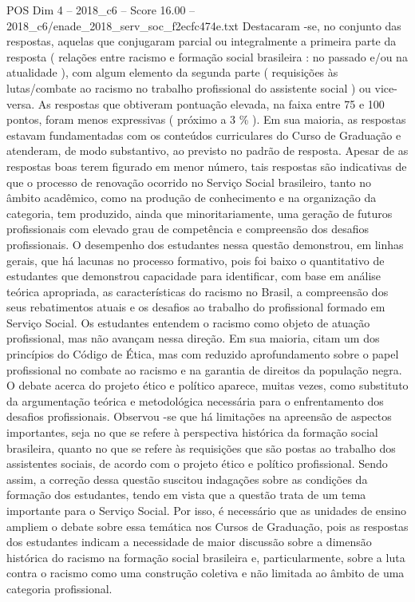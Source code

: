 \begin{textsample}{POS Dim 4 – 2018\_c6 – Score 16.00 – 2018\_c6/enade\_2018\_serv\_soc\_f2ecfc474e.txt}
Destacaram -se, no conjunto das respostas, aquelas que conjugaram parcial ou integralmente a primeira parte da resposta ( relações entre racismo e formação social brasileira : no passado e/ou na atualidade ), com algum elemento da segunda parte ( requisições às lutas/combate ao racismo no trabalho profissional do assistente social ) ou vice-versa.
As respostas que obtiveram pontuação elevada, na faixa entre 75 e 100 pontos, foram menos expressivas ( próximo a 3 \% ).
Em sua maioria, as respostas estavam fundamentadas com os conteúdos curriculares do Curso de Graduação e atenderam, de modo substantivo, ao previsto no padrão de resposta.
Apesar de as respostas boas terem figurado em menor número, tais respostas são indicativas de que o processo de renovação ocorrido no Serviço Social brasileiro, tanto no âmbito acadêmico, como na produção de conhecimento e na organização da categoria, tem produzido, ainda que minoritariamente, uma geração de futuros profissionais com elevado grau de competência e compreensão dos desafios profissionais.
O desempenho dos estudantes nessa questão demonstrou, em linhas gerais, que há lacunas no processo formativo, pois foi baixo o quantitativo de estudantes que demonstrou capacidade para identificar, com base em análise teórica apropriada, as características do racismo no Brasil, a compreensão dos seus rebatimentos atuais e os desafios ao trabalho do profissional formado em Serviço Social.
Os estudantes entendem o racismo como objeto de atuação profissional, mas não avançam nessa direção.
Em sua maioria, citam um dos princípios do Código de Ética, mas com reduzido aprofundamento sobre o papel profissional no combate ao racismo e na garantia de direitos da população negra.
O debate acerca do projeto ético e político aparece, muitas vezes, como substituto da argumentação teórica e metodológica necessária para o enfrentamento dos desafios profissionais.
Observou -se que há limitações na apreensão de aspectos importantes, seja no que se refere à perspectiva histórica da formação social brasileira, quanto no que se refere às requisições que são postas ao trabalho dos assistentes sociais, de acordo com o projeto ético e político profissional.
Sendo assim, a correção dessa questão suscitou indagações sobre as condições da formação dos estudantes, tendo em vista que a questão trata de um tema importante para o Serviço Social.
Por isso, é necessário que as unidades de ensino ampliem o debate sobre essa temática nos Cursos de Graduação, pois as respostas dos estudantes indicam a necessidade de maior discussão sobre a dimensão histórica do racismo na formação social brasileira e, particularmente, sobre a luta contra o racismo como uma construção coletiva e não limitada ao âmbito de uma categoria profissional.

\end{textsample}
